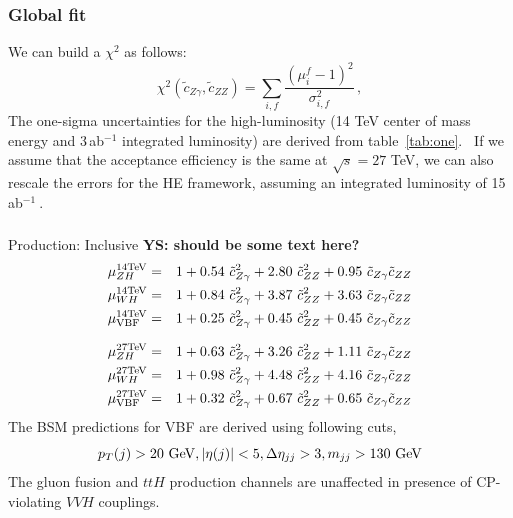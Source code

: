 \documentclass[../report.tex]{subfiles}
\begin{document}
\subsubsection{Global fit}

We can build a $\chi^2$  as follows:
\begin{equation}
 \chi^2({\tilde c}_{Z\gamma},{\tilde c}_{ZZ}) = \sum_{i,f} \frac{(\mu_i^f -1)^2}{\sigma_{i,f}^2} \, ,
\end{equation}
The one-sigma uncertainties for the high-luminosity (14 TeV center of mass energy and 3\,ab$^{-1}$ integrated luminosity) are derived from table~\ref{tab:one}. \textit\
If we assume that the acceptance efficiency is the same at $\sqrt{s}=27$ TeV, we can also rescale the errors for the HE framework, assuming an integrated luminosity of 15\,ab$^{-1}\
$.

\subsubsection*{}{Production: Inclusive}
{\bf YS: should be some text here?}
\begin{eqnarray}
 \mu_{ZH}^{\rm 14 TeV} &=& 1 +  0.54~ {\tilde c}_{Z\gamma}^2 + 2.80~ {\tilde c}_{ZZ}^2 + 0.95~ {\tilde c}_{Z\gamma} {\tilde c}_{ZZ} \\
 \mu_{WH}^{\rm 14 TeV} &=& 1  + 0.84~ {\tilde c}_{Z\gamma}^2 + 3.87~ {\tilde c}_{ZZ}^2
   + 3.63~{\tilde c}_{Z\gamma}{\tilde c}_{ZZ} \\
 \mu_{\rm VBF}^{\rm 14 TeV} &=& 1  + 0.25~ {\tilde c}_{Z\gamma}^2 + 0.45~ {\tilde c}_{ZZ}^2
   + 0.45~{\tilde c}_{Z\gamma}{\tilde c}_{ZZ}
\end{eqnarray}

\begin{eqnarray}
 \mu_{ZH}^{\rm 27 TeV} &=& 1 +  0.63~ {\tilde c}_{Z\gamma}^2 + 3.26~ {\tilde c}_{ZZ}^2 + 1.11~ {\tilde c}_{Z\gamma} {\tilde c}_{ZZ} \\
 \mu_{WH}^{\rm 27 TeV} &=& 1 + 0.98~ {\tilde c}_{Z\gamma}^2 + 4.48~ {\tilde c}_{ZZ}^2
  + 4.16~{\tilde c}_{Z\gamma}{\tilde c}_{ZZ} \\
 \mu_{\rm VBF}^{\rm 27 TeV} &=& 1  + 0.32~ {\tilde c}_{Z\gamma}^2 + 0.67~ {\tilde c}_{ZZ}^2
  + 0.65~{\tilde c}_{Z\gamma}{\tilde c}_{ZZ}
\end{eqnarray}
The BSM predictions for VBF are derived using following cuts,
\begin{equation}
 p_T(j) > 20~{\rm GeV}, |\eta(j)| < 5, \Delta\eta_{jj} > 3, m_{jj} > 130~{\rm GeV} \nonumber
\end{equation}
The gluon fusion and $ttH$ production channels are unaffected in presence of CP-violating $VVH$
couplings.
\end{document}
